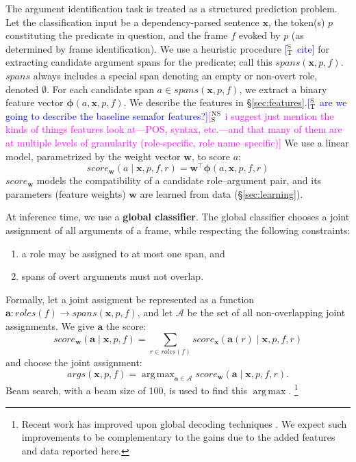 \documentclass[11pt,a4paper]{article}
\DeclareMathOperator*{\argmax}{arg\,max}
\newcommand{\ensuretext}[1]{#1}
\newcommand{\nssmarker}{\ensuretext{\textcolor{magenta}{\ensuremath{^{\textsc{NS}}_{\textsc{S}}}}}}
\newcommand{\stmarker}{\ensuretext{\textcolor{blue}{\ensuremath{^{\textsc{S}}_{\textsc{T}}}}}}
\newcommand{\arkcomment}[3]{\ensuretext{\textcolor{#3}{[#1 #2]}}}
\newcommand{\nss}[1]{\arkcomment{\nssmarker}{#1}{magenta}}
\newcommand{\st}[1]{\arkcomment{\stmarker}{#1}{blue}}
\newcommand{\term}[1]{\textbf{#1}} %
\begin{document}
The argument identification task is treated as a structured prediction problem.
Let the classification input be a dependency-parsed sentence $\mathbf{x}$, 
the token(s) $p$ constituting the predicate in question, and the frame $f$ evoked by $p$
(as determined by frame identification). 
We use a heuristic procedure \st{cite} for extracting candidate argument spans 
for the predicate; call this $\textit{spans}(\mathbf{x}, p, f)$.
$\textit{spans}$ always includes a special span denoting an empty or non-overt role, denoted $\emptyset$. 
For each candidate span $a \in \textit{spans}(\mathbf{x}, p, f)$, we extract a binary feature vector 
$\mathbf{\phi}(a, \mathbf{x}, p, f)$.
We describe the features in \S\ref{sec:features}.\st{are we going to describe the baseline semafor features?}\nss{i suggest just mention the kinds of things features look at---POS, syntax, etc.---and that many of them are at multiple levels of granularity (role-specific, role name--specific)}
We use a linear model, parametrized by the weight vector $\mathbf{w}$, to score $a$:
\begin{equation}
\textit{score}_\mathbf{w}(a \mid \mathbf{x}, p, f, r) = \mathbf{w}^\top \mathbf{\phi}(a, \mathbf{x}, p, f, r)
\end{equation}
$\textit{score}_\mathbf{w}$ models the compatibility  of a candidate
role--argument pair, and its parameters (feature weights) $\mathbf{w}$ are
learned from data (\S\ref{sec:learning}).

At inference time, we use a \term{global classifier}.
The global classifier chooses a joint assignment of all arguments of a frame, while respecting the following constraints:
\begin{enumerate}
  \item a role may be assigned to at most one span, and
  \item spans of overt arguments must not overlap.
\end{enumerate}
Formally, let a joint assigment be represented as a function $\mathbf{a}: \textit{roles}(f) \rightarrow \textit{spans}(\mathbf{x}, p, f)$, %
 and let $\mathcal{A}$ be the set of all non-overlapping joint assignments.
We give $\mathbf{a}$ the score:
\begin{equation}
\textit{score}_{\mathbf{w}}(\mathbf{a} \mid \mathbf{x}, p, f) =
    \sum_{r \in \textit{roles}(f)}{\textit{score}_\mathbf{x}(\mathbf{a}(r) \mid \mathbf{x}, p, f, r)}
\end{equation}
and choose the joint assignment:
\begin{equation}
\label{eq:args}
\textit{args}(\mathbf{x}, p, f) =
    \argmax_{\mathbf{a} \in \mathcal{A}} {
        \textit{score}_{\mathbf{w}}(\mathbf{a} \mid \mathbf{x}, p, f, r)
    }.
\end{equation}
Beam search, with a beam size of 100, is used to find this $\argmax$.%
\footnote{Recent work has improved upon global decoding techniques \citep{tackstrom-15}.
We expect such improvements to be complementary to the gains due to the added features and data reported here.}
\end{document}

